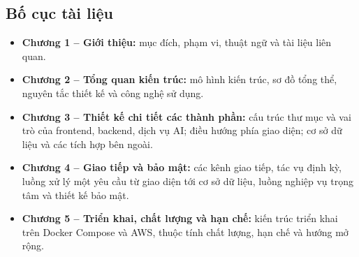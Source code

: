 \subsection{Bố cục tài liệu}

\begin{itemize}
    \item \textbf{Chương 1 -- Giới thiệu:} mục đích, phạm vi, thuật ngữ và tài liệu liên quan.
    \item \textbf{Chương 2 -- Tổng quan kiến trúc:} mô hình kiến trúc, sơ đồ tổng thể, nguyên tắc thiết kế và công nghệ sử dụng.
    \item \textbf{Chương 3 -- Thiết kế chi tiết các thành phần:} cấu trúc thư mục và vai trò của frontend, backend, dịch vụ AI; điều hướng phía giao diện; cơ sở dữ liệu và các tích hợp bên ngoài.
    \item \textbf{Chương 4 -- Giao tiếp và bảo mật:} các kênh giao tiếp, tác vụ định kỳ, luồng xử lý một yêu cầu từ giao diện tới cơ sở dữ liệu, luồng nghiệp vụ trọng tâm và thiết kế bảo mật.
    \item \textbf{Chương 5 -- Triển khai, chất lượng và hạn chế:} kiến trúc triển khai trên Docker Compose và AWS, thuộc tính chất lượng, hạn chế và hướng mở rộng.
\end{itemize}
